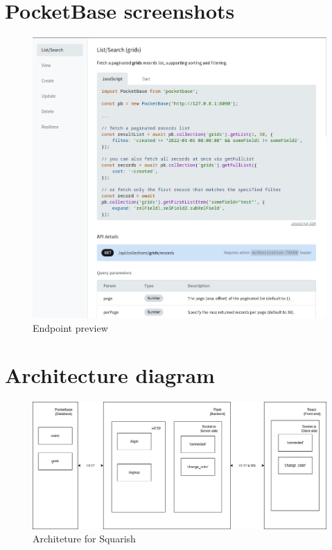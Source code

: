 \section{PocketBase screenshots}
\begin{figure}[H]
    \centering
    \includegraphics[width=\textwidth + 10]{../images/pbEndpoints}
    \caption{Endpoint preview}
    \label{fig:pbEndpoints}
\end{figure}


\section{Architecture diagram}\label{sec:architecture-diagram}
\begin{figure}[H]
    \centering
    \includegraphics[width=\textwidth + 10]{../images/architecture}
    \caption{Architeture for Squarish}
    \label{fig:architecture}
\end{figure}